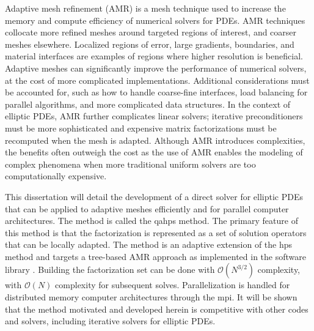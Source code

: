 Adaptive mesh refinement (AMR) is a mesh technique used to increase the memory and compute efficiency of numerical solvers for PDEs. AMR techniques collocate more refined meshes around targeted regions of interest, and coarser meshes elsewhere. Localized regions of error, large gradients, boundaries, and material interfaces are examples of regions where higher resolution is beneficial. Adaptive meshes can significantly improve the performance of numerical solvers, at the cost of more complicated implementations. Additional considerations must be accounted for, such as how to handle coarse-fine interfaces, load balancing for parallel algorithms, and more complicated data structures. In the context of elliptic PDEs, AMR further complicates linear solvers; iterative preconditioners must be more sophisticated and expensive matrix factorizations must be recomputed when the mesh is adapted. Although AMR introduces complexities, the benefits often outweigh the cost as the use of AMR enables the modeling of complex phenomena when more traditional uniform solvers are too computationally expensive.

This dissertation will detail the development of a direct solver for elliptic PDEs that can be applied to adaptive meshes efficiently and for parallel computer architectures. The method is called the \gls{qahps} method. The primary feature of this method is that the factorization is represented as a set of solution operators that can be locally adapted. The method is an adaptive extension of the \gls{hps} method \citep{gillman2014direct} and targets a tree-based AMR approach as implemented in the \pforest software library \citep{burstedde2011p4est}. Building the factorization set can be done with $\mathcal{O}(N^{3/2})$ complexity, with $\mathcal{O}(N)$ complexity for subsequent solves. Parallelization is handled for distributed memory computer architectures through the \gls{mpi}. It will be shown that the method motivated and developed herein is competitive with other codes and solvers, including iterative solvers for elliptic PDEs.
